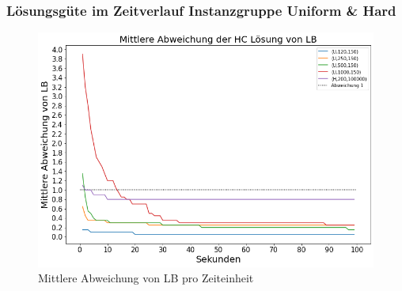 \documentclass{beamer}
\begin{document}
\begin{frame}

\frametitle{Lösungsgüte im Zeitverlauf Instanzgruppe Uniform \& Hard }

\begin{figure}[!htbp]
\begin{center}
\includegraphics[scale=0.35]{img/uniform_time.png}
\end{center}
\caption{Mittlere Abweichung von LB pro Zeiteinheit}
\label{fig:architecture}
\end{figure}

\end{frame}
\end{document}
